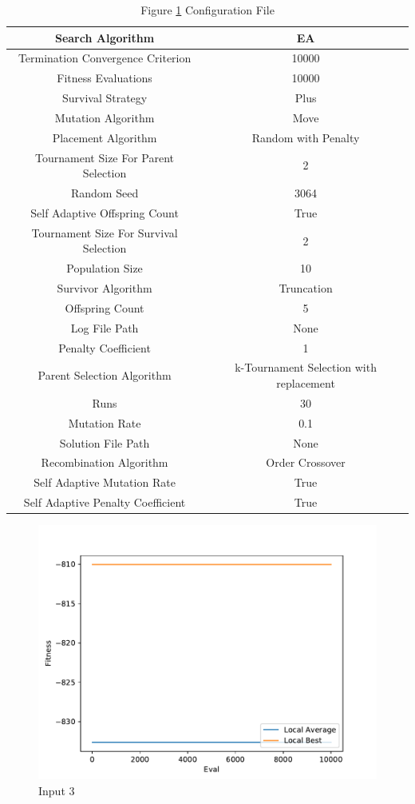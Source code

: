 \documentclass{standalone}
\begin{document}
\begin{table}[!htb]
	\centering
	\caption{Figure \ref{fig:graph_3064} Configuration File}
	\label{tab:graph_3064}
	\begin{tabular}{| c | c |}
		\hline
		Search Algorithm		& EA		 \\
		\hline
		Termination Convergence Criterion		& 10000		 \\
		\hline
		Fitness Evaluations		& 10000		 \\
		\hline
		Survival Strategy		& Plus		 \\
		\hline
		Mutation Algorithm		& Move		 \\
		\hline
		Placement Algorithm		& Random with Penalty		 \\
		\hline
		Tournament Size For Parent Selection		& 2		 \\
		\hline
		Random Seed		& 3064		 \\
		\hline
		Self Adaptive Offspring Count		& True		 \\
		\hline
		Tournament Size For Survival Selection		& 2		 \\
		\hline
		Population Size		& 10		 \\
		\hline
		Survivor Algorithm		& Truncation		 \\
		\hline
		Offspring Count		& 5		 \\
		\hline
		Log File Path		& None		 \\
		\hline
		Penalty Coefficient		& 1		 \\
		\hline
		Parent Selection Algorithm		& k-Tournament Selection with replacement		 \\
		\hline
		Runs		& 30		 \\
		\hline
		Mutation Rate		& 0.1		 \\
		\hline
		Solution File Path		& None		 \\
		\hline
		Recombination Algorithm		& Order Crossover		 \\
		\hline
		Self Adaptive Mutation Rate		& True		 \\
		\hline
		Self Adaptive Penalty Coefficient		& True		 \\
		\hline
	\end{tabular}
\end{table}
\begin{figure}[!htb]
	\caption{Input 3}
	\label{fig:graph_3064}
	\includegraphics[width=\textwidth]{../graphs/graphs/3064.pdf}
\end{figure}
\end{document}
